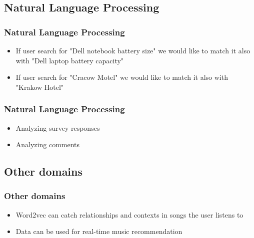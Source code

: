 
\subsection{Natural Language Processing}


\begin{frame}
	\frametitle{Natural Language Processing}
	
	\begin{itemize}
		\item If user search for "Dell notebook battery size" we would like to match it also with "Dell laptop battery capacity"
		\item If user search for "Cracow Motel" we would like to match it also with "Krakow Hotel"
	\end{itemize}
	
\end{frame}


\begin{frame}
\frametitle{Natural Language Processing}

\begin{itemize}
	\item Analyzing survey responses
	\item Analyzing comments
\end{itemize}

\end{frame}


\subsection{Other domains}


\begin{frame}
\frametitle{Other domains}

\begin{itemize}
	\item Word2vec can catch relationships and contexts in songs the user listens to
	\item Data can be used for real-time music recommendation
\end{itemize}

\end{frame}

